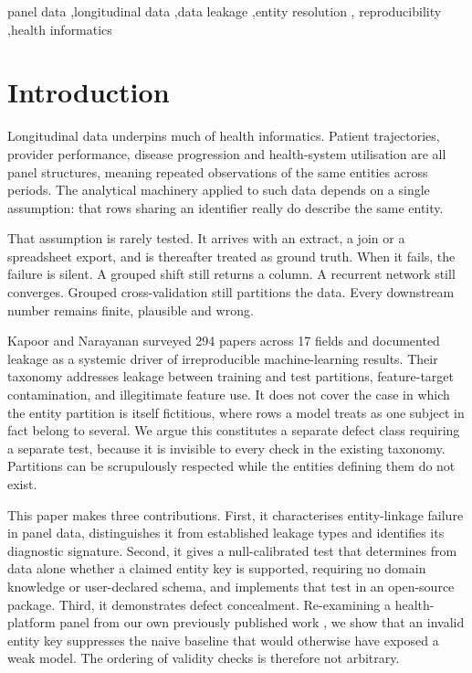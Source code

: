 \documentclass[preprint,12pt]{elsarticle}
\begin{document}
\begin{frontmatter}
\begin{abstract}
\textbf{Conclusions:} Entity-linkage failure is a distinct and machine-detectable
defect class in longitudinal health data. Because it suppresses the naive
baseline conventionally relied upon to expose over-optimistic results, that
baseline alone offers insufficient protection, and key validity should be
established first.
\end{abstract}

\begin{keyword}
panel data \sep longitudinal data \sep data leakage \sep entity resolution \sep
reproducibility \sep health informatics
\end{keyword}

\end{frontmatter}

\section{Introduction}

Longitudinal data underpins much of health informatics. Patient trajectories,
provider performance, disease progression and health-system utilisation are all
panel structures, meaning repeated observations of the same entities across
periods. The analytical machinery applied to such data depends on a single
assumption: that rows sharing an identifier really do describe the same entity.

That assumption is rarely tested. It arrives with an extract, a join or a
spreadsheet export, and is thereafter treated as ground truth. When it fails,
the failure is silent. A grouped shift still returns a column. A recurrent
network still converges. Grouped cross-validation still partitions the data.
Every downstream number remains finite, plausible and wrong.

Kapoor and Narayanan \cite{kapoor2023} surveyed 294 papers across 17 fields and
documented leakage as a systemic driver of irreproducible machine-learning
results. Their taxonomy addresses leakage between training and test partitions,
feature-target contamination, and illegitimate feature use. It does not cover
the case in which the entity partition is itself fictitious, where rows a model
treats as one subject in fact belong to several. We argue this constitutes a
separate defect class requiring a separate test, because it is invisible to
every check in the existing taxonomy. Partitions can be scrupulously respected
while the entities defining them do not exist.

This paper makes three contributions. First, it characterises entity-linkage
failure in panel data, distinguishes it from established leakage types and
identifies its diagnostic signature. Second, it gives a null-calibrated test
that determines from data alone whether a claimed entity key is supported,
requiring no domain knowledge or user-declared schema, and implements that test
in an open-source package. Third, it demonstrates defect concealment.
Re-examining a health-platform panel from our own previously published work
\cite{prior}, we show that an invalid entity key suppresses the naive baseline
that would otherwise have exposed a weak model. The ordering of validity checks
is therefore not arbitrary.
\end{document}
